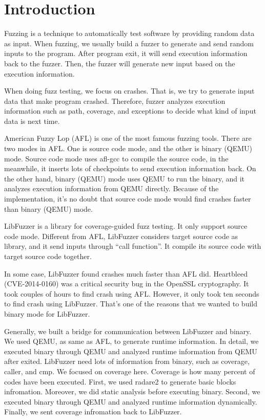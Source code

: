 
\section{Introduction}
\label{sec:intro}

  Fuzzing is a technique to automatically test software by providing random data as input. When fuzzing, we usually build a fuzzer to generate and send random inputs to the program. After program exit, it will send execution information back to the fuzzer. Then, the fuzzer will generate new input based on the execution information.

  When doing fuzz testing, we focus on crashes. That is, we try to generate input data that make program crashed. Therefore, fuzzer analyzes execution information such as path, coverage, and exceptions to decide what kind of input data is next time.

  American Fuzzy Lop (AFL)\cite{AFL} is one of the most famous fuzzing tools. There are two modes in AFL. One is source code mode, and the other is binary (QEMU) mode. Source code mode uses afl-gcc to compile the source code, in the meanwhile, it inserts lots of checkpoints to send execution information back. On the other hand, binary (QEMU) mode uses QEMU to run the binary, and it analyzes execution information from QEMU directly. Because of the implementation, it’s no doubt that source code mode would find crashes faster than binary (QEMU) mode.

  LibFuzzer\cite{libfuzz} is a library for coverage-guided fuzz testing. It only support source code mode. Different from AFL, LibFuzzer considers target source code as library, and it send inputs through “call function”. It compile its source code with target source code together.

  In some case, LibFuzzer found crashes much faster than AFL did. Heartbleed (CVE-2014-0160) was a critical security bug in the OpenSSL cryptography. It took couples of hours to find crash using AFL. However, it only took ten seconds to find crash using LibFuzzer. That’s one of the reasons that we wanted to build binary mode for LibFuzzer.

  Generally, we built a bridge for communication between LibFuzzer and binary. We used QEMU, as same as AFL, to generate runtime information. In detail, we executed binary through QEMU and analyzed runtime information from QEMU after exited. LibFuzzer need lots of information from binary, such as coverage, caller, and cmp. We focused on coverage here. Coverage is how many percent of codes have been executed. First, we used radare2 to generate basic blocks infromation. Moreover, we did static analysis before executing binary. Second, we executed binary through QEMU and analyzed runtime information dynamically. Finally, we sent coverage infromation back to LibFuzzer.
